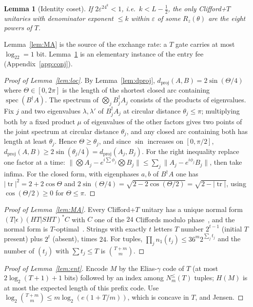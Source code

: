\documentclass[aps,prx,twocolumn,superscriptaddress,nofootinbib,longbibliography]{revtex4-2}
\theoremstyle{plain}
\newtheorem{lemma}{Lemma}
\theoremstyle{definition}
\theoremstyle{remark}
\newcommand{\dproj}{d_{\mathrm{proj}}}
\newcommand{\tr}{\operatorname{tr}}
\DeclareMathOperator{\spec}{spec}
\begin{document}
\begin{lemma}[Identity coset]\label{lem:identity}
If $2\varepsilon^24^k<1$, i.e.\ $k<L-\tfrac12$, the only Clifford+$T$ unitaries with denominator exponent $\le k$ within $\varepsilon$ of some $R_z(\theta)$ are the eight powers of $T$.
\end{lemma}
Lemma~\ref{lem:MA} is the source of the exchange rate: a $T$ gate carries at most $\log_22=1$ bit. Lemma~\ref{lem:identity} is an elementary instance of the entry fee (Appendix~\ref{app:conj}).


\begin{proof}[Proof of Lemma~\ref{lem:loc}]
By Lemma~\ref{lem:dproj}, $\dproj(A,B)=2\sin(\Theta/4)$ where $\Theta\in[0,2\pi]$ is the length of the shortest closed arc containing $\spec(B^\dagger A)$. The spectrum of $\bigotimes_jB_j^\dagger A_j$ consists of the products of eigenvalues. Fix $j$ and two eigenvalues $\lambda,\lambda'$ of $B_j^\dagger A_j$ at circular distance $\theta_j\le\pi$; multiplying both by a fixed product $\mu$ of eigenvalues of the other factors gives two points of the joint spectrum at circular distance $\theta_j$, and any closed arc containing both has length at least $\theta_j$. Hence $\Theta\ge\theta_j$, and since $\sin$ increases on $[0,\pi/2]$, $\dproj(A,B)\ge2\sin(\theta_j/4)=\dproj(A_j,B_j)$. For the right inequality replace one factor at a time: $\|\bigotimes A_j-e^{i\sum\phi_j}\bigotimes B_j\|\le\sum_j\|A_j-e^{i\phi_j}B_j\|$, then take infima. For the closed form, with eigenphases $a,b$ of $B^\dagger A$ one has $|\tr|^2=2+2\cos\Theta$ and $2\sin(\Theta/4)=\sqrt{2-2\cos(\Theta/2)}=\sqrt{2-|\tr|}$, using $\cos(\Theta/2)\ge0$ for $\Theta\le\pi$.
\end{proof}

\begin{proof}[Proof of Lemma~\ref{lem:MA}]
Every Clifford+$T$ unitary has a unique normal form $(T|\epsilon)(HT|SHT)^*C$ with $C$ one of the $24$ Cliffords modulo phase~\cite{MA08}, and the normal form is $T$-optimal~\cite{KMM13}. Strings with exactly $t$ letters $T$ number $2^{t-1}$ (initial $T$ present) plus $2^t$ (absent), times $24$. For tuples, $\prod_jn_1(t_j)\le36^m2^{\sum_jt_j}$ and the number of $(t_j)$ with $\sum t_j\le T$ is $\binom{T+m}{m}$.
\end{proof}

\begin{proof}[Proof of Lemma~\ref{lem:ent}]
Encode $M$ by the Elias-$\gamma$ code of $T$ (at most $2\log_2(T+1)+1$ bits) followed by an index among $N^{\le}_m(T)$ tuples; $H(M)$ is at most the expected length of this prefix code. Use $\log_2\binom{T+m}{m}\le m\log_2(e(1+T/m))$, which is concave in $T$, and Jensen.
\end{proof}
\end{document}
